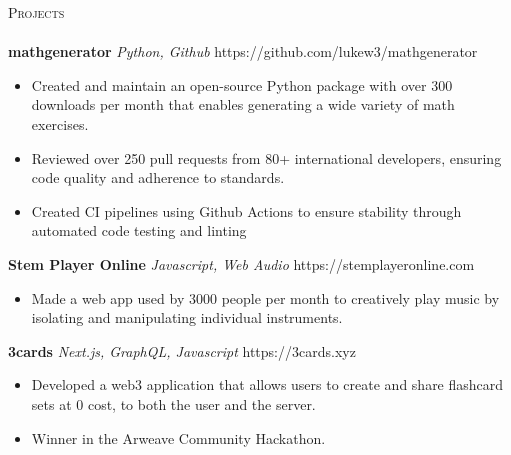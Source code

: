 \documentclass[letterpaper]{article}
\newcommand{\lineunder} {
    \vspace*{-8pt} \\
    \hspace*{-18pt} \hrulefill \\
}
\newcommand{\header} [1] {
    {\hspace*{-18pt}\vspace*{6pt} \textsc{#1}}
    \vspace*{-6pt} \lineunder
}
\begin{document}
\header{Projects}

    {\textbf{mathgenerator}} {\sl Python, Github} \hfill https://github.com/lukew3/mathgenerator\\
    \vspace{-2mm}
    \begin{itemize} \itemsep -1mm
    
        \item Created and maintain an open-source Python package with over 300 downloads per month that enables generating a wide variety of math exercises.

        \item Reviewed over 250 pull requests from 80+ international developers, ensuring code quality and adherence to standards.

        \item Created CI pipelines using Github Actions to ensure stability through automated code testing and linting

    \end{itemize}
    \vspace{-2mm}

    {\textbf{Stem Player Online}} {\sl Javascript, Web Audio} \hfill https://stemplayeronline.com\\
    \vspace{-2mm}
    \begin{itemize} \itemsep -1mm

        \item Made a web app used by 3000 people per month to creatively play music by isolating and manipulating individual instruments.
        
    \end{itemize}
    \vspace{-2mm}

    {\textbf{3cards}} {\sl Next.js, GraphQL, Javascript} \hfill https://3cards.xyz\\
    \vspace{-2mm}
    \begin{itemize} \itemsep -1mm

        \item Developed a web3 application that allows users to create and share flashcard sets at 0 cost, to both the user and the server.
        \item Winner in the Arweave Community Hackathon.
            
    \end{itemize}
    \vspace{-2mm}
\end{document}
